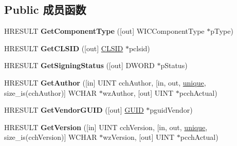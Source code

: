 \subsection*{Public 成员函数}
\begin{DoxyCompactItemize}
\item 
\mbox{\label{interface_i_w_i_c_component_info_a0ed9a480345161c2d88450072c8e2f3e}} 
H\+R\+E\+S\+U\+LT {\bfseries Get\+Component\+Type} (\mbox{[}out\mbox{]} W\+I\+C\+Component\+Type $\ast$p\+Type)
\item 
\mbox{\label{interface_i_w_i_c_component_info_acdfc3fc2d2ba664e4a5bf6d97a4673c4}} 
H\+R\+E\+S\+U\+LT {\bfseries Get\+C\+L\+S\+ID} (\mbox{[}out\mbox{]} \hyperlink{struct___i_i_d}{C\+L\+S\+ID} $\ast$pclsid)
\item 
\mbox{\label{interface_i_w_i_c_component_info_a9382253dd9daa61274ca94f1c069a9cc}} 
H\+R\+E\+S\+U\+LT {\bfseries Get\+Signing\+Status} (\mbox{[}out\mbox{]} D\+W\+O\+RD $\ast$p\+Status)
\item 
\mbox{\label{interface_i_w_i_c_component_info_ab97ffd544c1a5e96bb5afb3b3a0919fc}} 
H\+R\+E\+S\+U\+LT {\bfseries Get\+Author} (\mbox{[}in\mbox{]} U\+I\+NT cch\+Author, \mbox{[}in, out, \hyperlink{interfaceunique}{unique}, size\+\_\+is(cch\+Author)\mbox{]} W\+C\+H\+AR $\ast$wz\+Author, \mbox{[}out\mbox{]} U\+I\+NT $\ast$pcch\+Actual)
\item 
\mbox{\label{interface_i_w_i_c_component_info_aab55dee90d79afa932a966c1e50dcc10}} 
H\+R\+E\+S\+U\+LT {\bfseries Get\+Vendor\+G\+U\+ID} (\mbox{[}out\mbox{]} \hyperlink{interface_g_u_i_d}{G\+U\+ID} $\ast$pguid\+Vendor)
\item 
\mbox{\label{interface_i_w_i_c_component_info_a65b337b6f59ddb8dd5aeb7c41b834c23}} 
H\+R\+E\+S\+U\+LT {\bfseries Get\+Version} (\mbox{[}in\mbox{]} U\+I\+NT cch\+Version, \mbox{[}in, out, \hyperlink{interfaceunique}{unique}, size\+\_\+is(cch\+Version)\mbox{]} W\+C\+H\+AR $\ast$wz\+Version, \mbox{[}out\mbox{]} U\+I\+NT $\ast$pcch\+Actual)
\item 
\mbox{\label{interface_i_w_i_c_component_info_a5aa95e9c9c5c46f729d2be28b35f170e}} 

\end{DoxyCompactItemize}
